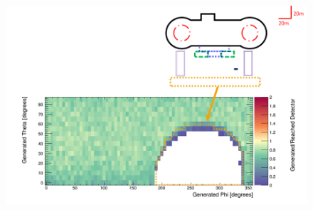 \begin{figure}
 \centering
 \includegraphics[width=\linewidth]{Chapter5/Figs/wylfaRasterNew/TurbineHallGen_Reached.png}
 \label{fig:TurbineHallGen_Reached}
\end{figure}




